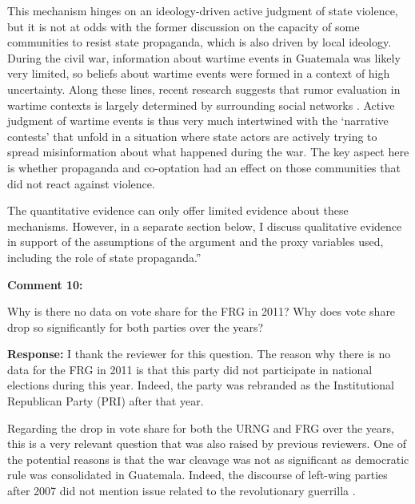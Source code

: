 \documentclass[12pt, a4paper, notitlepage]{article}
\begin{document}
This mechanism hinges on an ideology-driven active judgment of state violence, but it is not at odds with the former discussion on the capacity of some communities to resist state propaganda, which is also driven by local ideology.
During the civil war, information about wartime events in Guatemala was likely very limited, so beliefs about wartime events were formed in a context of high uncertainty.
Along these lines, recent research suggests that rumor evaluation in wartime contexts is largely determined by surrounding social networks \citep{Schon:2021wf}.
Active judgment of wartime events is thus very much intertwined with the `narrative contests' that unfold in a situation where state actors are actively trying to spread misinformation about what happened during the war.
The key aspect here is whether propaganda and co-optation had an effect on those communities that did not react against violence.

The quantitative evidence can only offer limited evidence about these mechanisms.
However, in a separate section below, I discuss qualitative evidence in support of the assumptions of the argument and the proxy variables used, including the role of state propaganda.''


\vspace{15pt}
\noindent\textbf{Comment 10:}
\begin{displayquote}
Why is there no data on vote share for the FRG in 2011? Why does vote share drop so significantly for both parties over the years?
\end{displayquote}

\noindent\textbf{Response:} I thank the reviewer for this question. The reason why there is no data for the FRG in 2011 is that this party did not participate in national elections during this year. Indeed, the party was rebranded as the Institutional Republican Party (PRI) after that year.

Regarding the drop in vote share for both the URNG and FRG over the years, this is a very relevant question that was also raised by previous reviewers.
One of the potential reasons is that the war cleavage was not as significant as democratic rule was consolidated in Guatemala.
Indeed, the discourse of left-wing parties after 2007 did not mention issue related to the revolutionary guerrilla \citep{Ibarra:2008to}.
\end{document}
